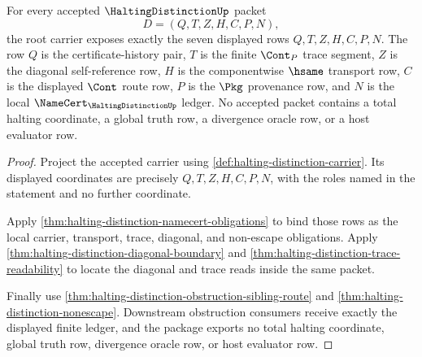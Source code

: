 \begin{theorem}
\label{thm:halting-distinction-root-carrier-surface}
For every accepted $\HaltingDistinctionUp$ packet
$$
D=(Q,T,Z,H,C,P,N),
$$
the root carrier exposes exactly the seven displayed rows $Q,T,Z,H,C,P,N$. The row $Q$ is the certificate-history pair, $T$ is the finite $\Cont_P$ trace segment, $Z$ is the diagonal self-reference row, $H$ is the componentwise $\hsame$ transport row, $C$ is the displayed $\Cont$ route row, $P$ is the $\Pkg$ provenance row, and $N$ is the local $\NameCert_{\HaltingDistinctionUp}$ ledger. No accepted packet contains a total halting coordinate, a global truth row, a divergence oracle row, or a host evaluator row.
\end{theorem}
\begin{proof}
Project the accepted carrier using \autoref{def:halting-distinction-carrier}. Its displayed coordinates are precisely $Q,T,Z,H,C,P,N$, with the roles named in the statement and no further coordinate.

Apply \autoref{thm:halting-distinction-namecert-obligations} to bind those rows as the local carrier, transport, trace, diagonal, and non-escape obligations. Apply \autoref{thm:halting-distinction-diagonal-boundary} and \autoref{thm:halting-distinction-trace-readability} to locate the diagonal and trace reads inside the same packet.

Finally use \autoref{thm:halting-distinction-obstruction-sibling-route} and \autoref{thm:halting-distinction-nonescape}. Downstream obstruction consumers receive exactly the displayed finite ledger, and the package exports no total halting coordinate, global truth row, divergence oracle row, or host evaluator row.
\end{proof}

